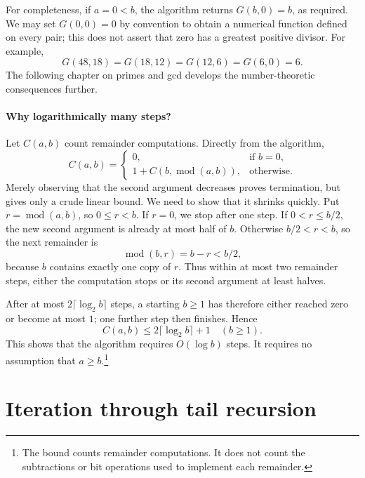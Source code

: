 For completeness, if $a=0<b$, the algorithm returns $G(b,0)=b$, as required.
We may set $G(0,0)=0$ by convention to obtain a numerical function defined on every pair;
this does not assert that zero has a greatest positive divisor.
For example,
\[
G(48,18)=G(18,12)=G(12,6)=G(6,0)=6.
\]
The following chapter on primes and gcd develops the number-theoretic
consequences further.

\paragraph{Why logarithmically many steps?}

Let $C(a,b)$ count remainder computations. Directly from the algorithm,
\[
C(a,b)=\begin{cases}
0,&\text{if }b=0,\\
1+C(b,\operatorname{mod}(a,b)),&\text{otherwise}.
\end{cases}
\]
Merely observing that the second argument decreases proves termination,
but gives only a crude linear bound. We need to show that it shrinks quickly.
Put $r=\operatorname{mod}(a,b)$, so $0\leq r<b$. If $r=0$, we stop after
one step. If $0<r\leq b/2$, the new second argument is already at most half
of $b$. Otherwise $b/2<r<b$, so the next remainder is
\[
\operatorname{mod}(b,r)=b-r<b/2,
\]
because $b$ contains exactly one copy of $r$. Thus within at most two
remainder steps, either the computation stops or its second argument at
least halves.

After at most $2\lceil\log_2 b\rceil$ steps, a starting $b\geq1$ has
therefore either reached zero or become at most $1$; one further step then
finishes. Hence
\[
C(a,b)\leq2\lceil\log_2 b\rceil+1\quad(b\geq1).
\]
This shows that the algorithm requires $O(\log b)$  steps. It requires no assumption that $a\geq b$.\footnote{The
bound counts remainder computations. It does not count the subtractions
or bit operations used to implement each remainder.}

\section{Iteration through tail recursion}
\label{sec:alg-iteration}

